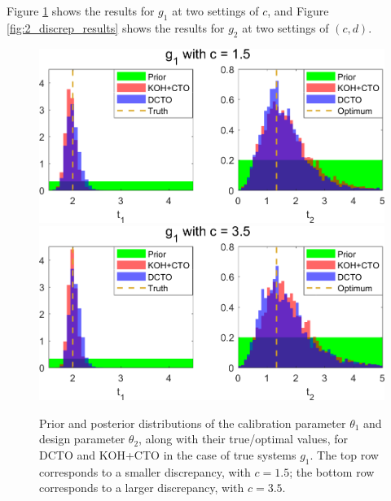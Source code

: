 \documentclass[12pt]{article}
\begin{document}
%
Figure \ref{fig:1_discrep_results} shows the results for $g_1$ at two settings of $c$, and Figure \ref{fig:2_discrep_results} shows the results for $g_2$ at two settings of $(c,d)$.
%
\begin{figure}
\centering
\includegraphics[scale=0.85]{FIG_KOHCTO_DCTO_comp_discrep1_results}
\includegraphics[scale=0.85]{FIG_KOHCTO_DCTO_comp_discrep2_results}
\captionsetup{width=.85\linewidth}
\caption{Prior and posterior distributions of the calibration parameter $\theta_1$ and design parameter $\theta_2$, along with their true/optimal values, for DCTO and KOH+CTO in the case of true systems $g_1$. The top row corresponds to a smaller discrepancy, with $c=1.5$; the bottom row corresponds to a larger discrepancy, with $c=3.5$.}
\label{fig:1_discrep_results}
\end{figure}
%
\end{document}
